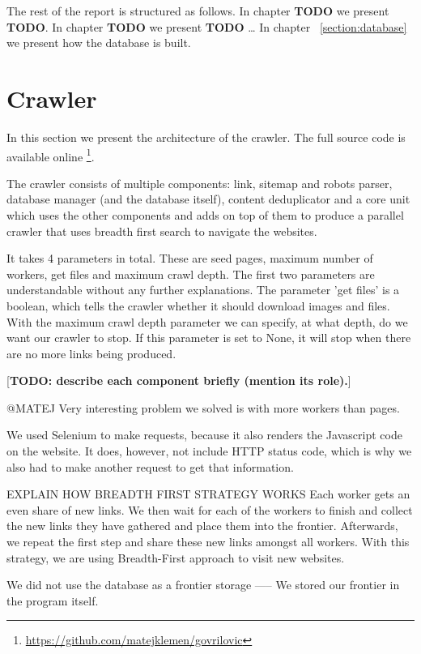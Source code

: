 \documentclass[9pt]{IEEEtran}
\begin{document}
The rest of the report is structured as follows.
In chapter \textbf{TODO} we present \textbf{TODO}.
In chapter \textbf{TODO} we present \textbf{TODO} \ldots
In chapter ~\ref{section:database} we present how the database is built.

\section{Crawler}
In this section we present the architecture of the crawler. 
The full source code is available online \footnote{\url{https://github.com/matejklemen/govrilovic}}.

The crawler consists of multiple components: link, sitemap and robots parser, database manager (and the database itself), content deduplicator and a core unit which uses the other components and adds on top of them to produce a parallel crawler that uses breadth first search to navigate the websites.

It takes 4 parameters in total. These are seed pages, maximum number of workers, get files and maximum crawl depth. The first two parameters are understandable without any further explanations. The parameter 'get files' is a boolean, which tells the crawler whether it should download images and files. With the maximum crawl depth parameter we can specify, at what depth, do we want our crawler to stop. If this parameter is set to None, it will stop when there are no more links being produced.

[\textbf{TODO: describe each component briefly (mention its role).}]

@MATEJ Very interesting problem we solved is with more workers than pages. 




We used Selenium to make requests, because it also renders the Javascript code on the website. It does, however, not include HTTP status code, which is why we also had to make another request to get that information.


EXPLAIN HOW BREADTH FIRST STRATEGY WORKS
Each worker gets an even share of new links. We then wait for each of the workers to finish and collect the new links they have gathered and place them into the frontier. Afterwards, we repeat the first step and share these new links amongst all workers. With this strategy, we are using Breadth-First approach to visit new websites.


We did not use the database as a frontier storage ----- We stored our frontier in the program itself.
\end{document}

